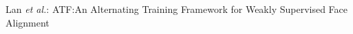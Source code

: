 \documentclass[journal,transmag]{IEEEtran}
\begin{document}
%
{Lan \MakeLowercase{\textit{et al.}}: ATF:An Alternating Training Framework for Weakly Supervised Face Alignment}
% 







\end{document}
